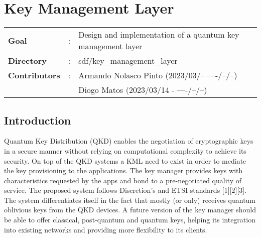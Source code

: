 \clearpage\clearpage
\graphicspath{{sdf/key_management_layer/figures/}}
\acresetall

\section{Key Management Layer}
\setcounter{tocdepth}{4}
\setcounter{secnumdepth}{4}

\begin{refsection}
	\begin{tcolorbox}
		\begin{tabular}{p{2.75cm} p{0.2cm} p{10.5cm}}
			\textbf{Goal}          &:& Design and implementation of a quantum key management layer\\
			\textbf{Directory}     &:& sdf/key\_management\_layer\\
			\textbf{Contributors}   &:& Armando Nolasco Pinto (2023/03/-- ----/--/--) \\
									&& Diogo Matos (2023/03/14 - ----/--/--) \\
		\end{tabular}
	\end{tcolorbox}


\subsection{Introduction}

Quantum Key Distribution (QKD) enables the negotiation of cryptographic keys in a secure manner without relying on computational complexity to achieve its security. On top of the QKD systems a \ac{KML} need to exist in order to mediate the key provisioning to the applications. The key manager provides keys with characteristics requested by the apps and bond to a pre-negotiated quality of service. The proposed system follows Discretion's and ETSI standards [1][2][3]. The system differentiates itself in the fact that mostly (or only) receives quantum oblivious keys from the QKD devices. A future version of the key manager should be able to offer classical, post-quantum and quantum keys, helping its integration into existing networks and providing more flexibility to its clients.



\end{refsection}
